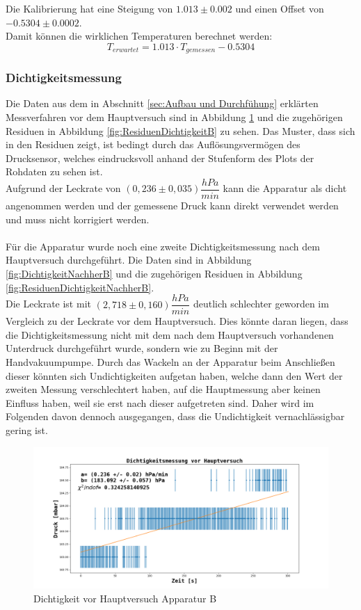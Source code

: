 \documentclass[12pt,a4paper]{article}
\begin{document}
Die Kalibrierung hat eine Steigung von $1.013\pm 0.002$ und einen Offset von $-0.5304\pm 0.0002$.\\
Damit können die wirklichen Temperaturen berechnet werden:
\begin{equation}
T_{erwartet}=1.013\cdot T_{gemessen}-0.5304
\end{equation}

\subsubsection{Dichtigkeitsmessung}
Die Daten aus dem in Abschnitt \ref{sec:Aufbau und Durchfühung} erklärten Messverfahren vor dem Hauptversuch sind in Abbildung \ref{fig:DichtigkeitB} und die zugehörigen Residuen in Abbildung \ref{fig:ResiduenDichtigkeitB} zu sehen. Das Muster, dass sich in den Residuen zeigt, ist bedingt durch das Auflösungsvermögen des Drucksensor, welches eindrucksvoll anhand der Stufenform des Plots der Rohdaten zu sehen ist. \\
Aufgrund der Leckrate von $(0,236 \pm 0,035) \dfrac{hPa}{min}$ kann die Apparatur als dicht angenommen werden und der gemessene Druck kann direkt verwendet werden und muss nicht korrigiert werden.\\
\\Für die Apparatur wurde noch eine zweite Dichtigkeitsmessung nach dem Hauptversuch durchgeführt. Die Daten sind in Abbildung \ref{fig:DichtigkeitNachherB} und die zugehörigen Residuen in Abbildung \ref{fig:ResiduenDichtigkeitNachherB}.\\
Die Leckrate ist mit $(2,718 \pm 0,160) \dfrac{hPa}{min}$ deutlich schlechter geworden im Vergleich zu der Leckrate vor dem Hauptversuch. Dies könnte daran liegen, dass die Dichtigkeitsmessung nicht mit dem nach dem Hauptversuch vorhandenen Unterdruck durchgeführt wurde, sondern wie zu Beginn mit der Handvakuumpumpe. Durch das Wackeln an der Apparatur beim Anschließen dieser könnten sich Undichtigkeiten aufgetan haben, welche dann den Wert der zweiten Messung verschlechtert haben, auf die Hauptmessung aber keinen Einfluss haben, weil sie erst nach dieser aufgetreten sind. Daher wird im Folgenden davon dennoch ausgegangen, dass die Undichtigkeit vernachlässigbar gering ist.

\begin{figure}
\includegraphics[width=\linewidth]{Bilder/Dichtigkeit_vorher_B.png}
\caption[Dichtigkeit vor Hauptversuch Apparatur B]{Dichtigkeit vor Hauptversuch Apparatur B}
\label{fig:DichtigkeitB}
\end{figure}
\end{document}

